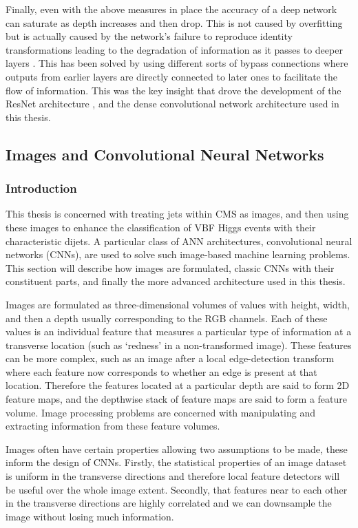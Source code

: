 Finally, even with the above measures in place the accuracy of a deep network can saturate as depth increases and then drop. This is not caused by overfitting but is actually caused by the network's failure to reproduce identity transformations leading to the degradation of information as it passes to deeper layers \cite{ResNet}. This has been solved by using different sorts of bypass connections where outputs from earlier layers are directly connected to later ones to facilitate the flow of information. This was the key insight that drove the development of the ResNet architecture \cite{ResNet}, and the dense convolutional network architecture used in this thesis.  


\subsection{Images and Convolutional Neural Networks}

\subsubsection{Introduction}
This thesis is concerned with treating jets within CMS as images, and then using these images to enhance the classification of VBF Higgs events with their characteristic dijets. 
A particular class of ANN architectures, convolutional neural networks (CNNs), are used to solve such image-based machine learning problems.
This section will describe how images are formulated, classic CNNs with their constituent parts, and finally the more advanced architecture used in this thesis. 


Images are formulated as three-dimensional volumes of values with height, width, and then a depth usually corresponding to the RGB channels. 
Each of these values is an individual feature that measures a particular type of information at a transverse location (such as `redness' in a non-transformed image). 
These features can be more complex, such as an image after a local edge-detection transform where each feature now corresponds to whether an edge is present at that location. 
Therefore the features located at a particular depth are said to form 2D feature maps, and the depthwise stack of feature maps are said to form a feature volume. 
Image processing problems are concerned with manipulating and extracting information from these feature volumes.

Images often have certain properties allowing two assumptions to be made, these inform the design of CNNs. 
Firstly, the statistical properties of an image dataset is uniform in the transverse directions and therefore local feature detectors will be useful over the whole image extent. 
Secondly, that features near to each other in the transverse directions are highly correlated and we can downsample the image without losing much information. 


